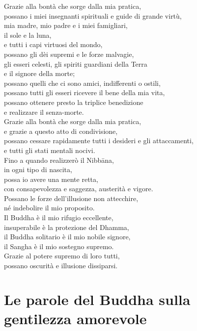 Grazie alla bontà che sorge dalla mia pratica, \\
possano i miei insegnanti spirituali e guide di grande virtù, \\
mia madre, mio padre e i miei famigliari, \\
il sole e la luna, \\
e tutti i capi virtuosi del mondo, \\
possano gli dèi supremi e le forze malvagie, \\
gli esseri celesti, gli spiriti guardiani della Terra \\
e il signore della morte; \\
possano quelli che ci sono amici, indifferenti o ostili, \\
possano tutti gli esseri ricevere il bene della mia vita, \\
possano ottenere presto la triplice benedizione \\
e realizzare il senza-morte. \\
Grazie alla bontà che sorge dalla mia pratica, \\
e grazie a questo atto di condivisione, \\
possano cessare rapidamente tutti i desideri e gli attaccamenti, \\
e tutti gli stati mentali nocivi. \\
Fino a quando realizzerò il Nibbāna, \\
in ogni tipo di nascita, \\
possa io avere una mente retta, \\
con consapevolezza e saggezza, austerità e vigore. \\
Possano le forze dell'illusione non attecchire, \\
né indebolire il mio proposito. \\
Il Buddha è il mio rifugio eccellente, \\
insuperabile è la protezione del Dhamma, \\
il Buddha solitario è il mio nobile signore, \\
il Sangha è il mio sostegno supremo. \\
Grazie al potere supremo di loro tutti, \\
possano oscurità e illusione dissiparsi. \\

\section{Le parole del Buddha sulla gentilezza amorevole}
\vspace*{-1em}\noindent{}

